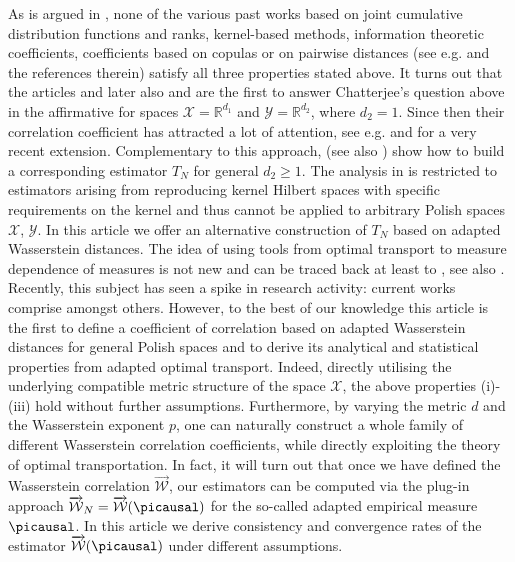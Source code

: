 \documentclass[10pt]{amsart}
\newcommand{\R}{\mathbb{R}}
\begin{document}
As is argued in \cite{chatterjee2020new}, none of the various past works based on joint cumulative distribution functions and ranks, kernel-based methods, information theoretic coefficients, coefficients based on copulas or on pairwise distances (see e.g. \cite{renyi1959measures,linfoot1957informational, blum1961distribution, rosenblatt1975quadratic,schweizer1981nonparametric, friedman1983graph, scarsini1984measures, szekely2007measuring,lyons2013distance,  gamboa2018sensitivity, zhang2019bet, puccetti2019measuring} and the references therein) satisfy all three properties stated above. It turns out that the articles \cite{trutschnig2011strong, junker2021estimating} and later also \cite{dette2013copula} and \cite{chatterjee2020new} are the first to answer Chatterjee's question above in the affirmative for spaces $\mathcal{X}=\R^{d_1}$ and $\mathcal{Y}=\R^{d_2}$, where $d_2=1$.  Since then their correlation coefficient has attracted a lot of attention, see e.g. \cite{shi2020power,cao2020correlations} and \cite{griessenberger2021multivariate} for a very recent extension. Complementary to this approach, \cite{deb2020kernel} (see also \cite{ke2019expected}) show how to build a corresponding estimator $T_N$ for general $d_2\ge 1$. The analysis in \cite{deb2020kernel} is restricted to estimators arising from reproducing kernel Hilbert spaces with specific requirements on the kernel and thus cannot be applied to arbitrary Polish spaces $\mathcal{X}$, $\mathcal{Y}$. In this article we offer an alternative construction of $T_N$ based on adapted Wasserstein distances. The idea of using tools from optimal transport to measure dependence of measures is not new and can be traced back at least to \cite{gini1915nuovi}, see also \cite{cifarelli2017centennial}. Recently, this subject has seen a spike in research activity: current works comprise \cite{ozair2019wasserstein,xiao2019disentangled, mori2020earth, mordant2021measuring, nies2021transport} amongst others. However, to the best of our knowledge this article is the first to define a coefficient of correlation based on adapted Wasserstein distances for general Polish spaces and to derive its analytical and statistical properties from adapted optimal transport. Indeed, directly utilising the underlying compatible metric structure of the space $\mathcal{X}$, the above properties (i)-(iii) hold without further assumptions. Furthermore, by varying the metric $d$ and the Wasserstein exponent $p$, one can naturally construct a whole family of different Wasserstein correlation coefficients, while directly exploiting the theory of optimal transportation. In fact, it will turn out that once we have defined the Wasserstein correlation $\overrightarrow{\mathcal{W}}$, our estimators can be computed via the plug-in approach $\overrightarrow{\mathcal{W}}_N=\overrightarrow{\mathcal{W}}(\picausal)$ for the so-called adapted empirical measure $\picausal$. In this article we derive consistency and convergence rates of the estimator $\overrightarrow{\mathcal{W}}(\picausal)$ under different assumptions.
\end{document}
